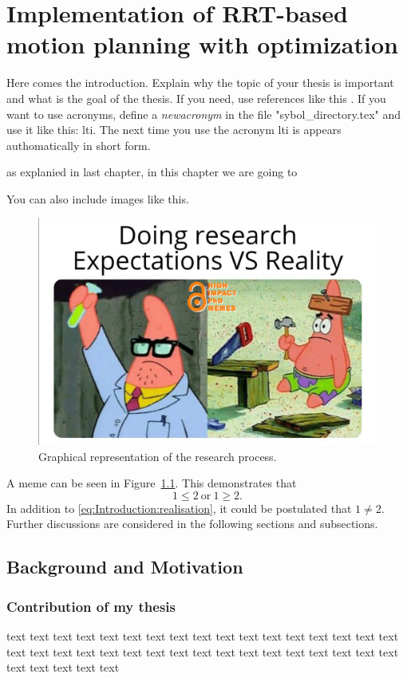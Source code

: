 \chapter{Implementation of RRT-based motion planning with optimization } \label{ch:Implementation of RRT-based motion planning with optimization }

Here comes the introduction. Explain why the topic of your thesis is important and what is the goal of the thesis. If you need, use references like this \cite{higham2020handbook}. If you want to use acronyms, define a \textit{newacronym} in the file "sybol\_directory.tex" and use it like this: \gls{lti}. The next time you use the acronym \gls{lti} is appears authomatically in short form. 

as explanied in last chapter, in this chapter we are going to 

You can also include images like this.


\begin{figure}[ht!]
    \centering
    \includegraphics[width=\textwidth]{03_images/meme.png}
    \caption{Graphical representation of the research process.}
    \label{fig:Introduction:meme}
\end{figure}


A meme can be seen in Figure~\ref*{fig:Introduction:meme}. This demonstrates that 
\begin{equation} \label{eq:Introduction:realisation}
	1 \le 2 \ \text{or} \ 1 \ge 2.
\end{equation}
In addition to \eqref{eq:Introduction:realisation}, it could be postulated that $1 \ne 2$. Further discussions are considered in the following sections and subsections.

\section{Background and Motivation} \label{sec:Introduction:Background}

\subsection{Contribution of my thesis}

text text text text text text text text text text text text text text text text text text text text text text text text text text text text text text text text text text text text text text text 